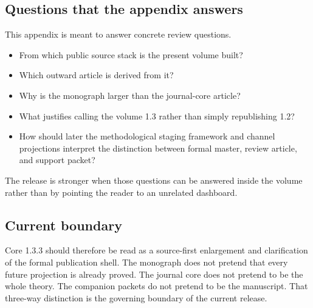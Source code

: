 \subsection{Questions that the appendix answers}

This appendix is meant to answer concrete review questions.

\begin{itemize}
\item From which public source stack is the present volume built?
\item Which outward article is derived from it?
\item Why is the monograph larger than the journal-core article?
\item What justifies calling the volume 1.3 rather than simply republishing 1.2?
\item How should later the methodological staging framework and channel projections interpret the distinction between formal
      master, review article, and support packet?
\end{itemize}

The release is stronger when those questions can be answered inside the volume rather than by
pointing the reader to an unrelated dashboard.

\subsection{Current boundary}

Core 1.3.3 should therefore be read as a source-first enlargement and clarification of the formal
publication shell.
The monograph does not pretend that every future projection is already proved.
The journal core does not pretend to be the whole theory.
The companion packets do not pretend to be the manuscript.
That three-way distinction is the governing boundary of the current release.

